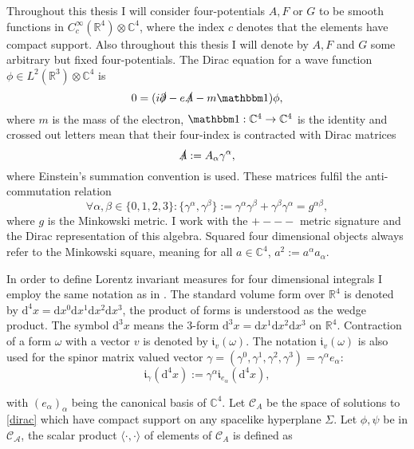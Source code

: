 \documentclass[b5paper,draft,openbib,12pt]{memoir}
\newcommand{\id}{{\mathbbm 1}}
\begin{document}
Throughout this thesis I will consider four-potentials $A, F$ or \(G\) to be smooth functions
in \(C_{c}^\infty(\mathbb{R}^4)\otimes \mathbb{C}^4\), where the index \(c\)
denotes that the elements have compact support. Also throughout this thesis I
will denote by \(A, F\) and \(G\) some arbitrary but fixed four-potentials. The Dirac
equation for a wave function \(\phi \in L^2(\mathbb{R}^3)\otimes \mathbb{C}^4\)
is
\begin{equation}\label{dirac}
0= (i\slashed{\partial}-e\slashed{A}-m \id) \phi,
\end{equation}
where \(m\) is the mass of the electron, \(\id: \mathbb{C}^4\rightarrow \mathbb{C}^4\) is the identity  and crossed out letters mean that their four-index is contracted with Dirac matrices
\begin{equation}
\slashed{A}:= A_\alpha \gamma^\alpha,
\end{equation}
where Einstein's summation convention is used. These matrices fulfil the anti-commutation relation
\begin{equation}
\forall \alpha, \beta \in \{0,1,2,3\}:\{\gamma^\alpha, \gamma^\beta\}:= \gamma^\alpha \gamma^\beta+ \gamma^\beta \gamma^\alpha= g^{\alpha \beta},
\end{equation}
where \(g\) is the Minkowski metric. I work with the \(+---\) metric signature and the Dirac representation of this algebra. Squared four dimensional objects always refer to the Minkowski square, meaning for all \(a\in \mathbb{C}^4\), \(a^2:= a^{\alpha} a_{\alpha}\). 

In order to define Lorentz invariant measures for four dimensional integrals I employ the same notation as in \cite{ivp1}. The standard volume form over \(\mathbb{R}^4\) is denoted by \(\mathrm{d}^4 x= \mathrm{d}x^0 \mathrm{d}x^1\mathrm{d}x^2 \mathrm{d}x^3\), the product of forms is understood as the wedge product. The symbol \(\mathrm{d}^3x\)  means the 3-form \(\mathrm{d}^3x= \mathrm{d}x^1\mathrm{d}x^2\mathrm{d}x^3\) on \(\mathbb{R}^4\). Contraction of a form \(\omega\) with a vector \(v\) is denoted by \(\mathfrak{i}_v(\omega)\). The notation \(\mathfrak{i}_v (\omega)\) is also used for the spinor matrix valued vector \(\gamma=(\gamma^0,\gamma^1,\gamma^2,\gamma^3)=\gamma^\alpha e_\alpha\):
\begin{equation}
\mathfrak{i}_\gamma (\mathrm{d}^4x) := \gamma^\alpha \mathfrak{i}_{e_\alpha}(\mathrm{d}^4 x),
\end{equation} 

with \((e_\alpha)_{\alpha}\) being the canonical basis of \(\mathbb{C}^4\). Let \(\mathcal{C}_A\) be the space of solutions to \eqref{dirac} which have compact support on any spacelike hyperplane \(\Sigma\). Let \(\phi, \psi\) be in \(\mathcal{C_A}\), the scalar product \(\langle \cdot, \cdot\rangle\) of elements of \(\mathcal{C}_A\) is defined as
\end{document}
